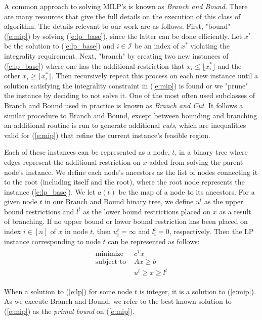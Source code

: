 \documentclass[10pt]{article}
\begin{document}
	A common approach to solving MILP's is known as \textit{Branch and Bound}. There are many resources that give the full details on the execution of this class of algorithm. The details relevant to our work are as follows. First, "bound" (\ref{e:mip}) by solving (\ref{e:lp_base}), since the latter can be done efficiently. Let $ x^* $ be the solution to (\ref{e:lp_base}) and $ i \in \mathcal{I} $ be an index of $ x^* $ violating the integrality requirement. Next, "branch" by creating two new instances of (\ref{e:lp_base}) where one has the additional restriction that $ x_i \leq \lfloor x_i^* \rfloor $ and the other $ x_i \geq \lceil x_i^* \rceil $. Then recursively repeat this process on each new instance until a solution satisfying the integrality constraint in (\ref{e:mip}) is found or we "prune" the instance by deciding to not solve it. One of the most often used subclasses of Branch and Bound used in practice is known as \textit{Branch and Cut}. It follows a similar procedure to Branch and Bound, except between bounding and branching an additional routine is run to generate additional \textit{cuts}, which are inequalities valid for (\ref{e:mip}) that refine the current instance's feasible region.
	
	Each of these instances can be represented as a node, $ t $, in a binary tree where edges represent the additional restriction on $ x $ added from solving the parent node's instance. We define each node's ancestors as the list of nodes connecting it to the root (including itself and the root), where the root node represents the instance (\ref{e:lp_base}). We let $ a(t) $ be the map of a node to its ancestors. For a given node $ t $ in our Branch and Bound binary tree, we define $ u^t $ as the upper bound restrictions and $ l^t $ as the lower bound restrictions placed on $ x $ as a result of branching. If no upper bound or lower bound restriction has been placed on index $ i \in [n] $ of $ x $ in node $ t $, then $ u_i^t = \infty $ and $ l_i^t = 0 $, respectively. Then the LP instance corresponding to node $ t $ can be represented as follows:
	\begin{align}
		\begin{split}
			\text{minimize } & c^T x \\
			\text{subject to } & Ax \geq b \\
			& u^t \geq x \geq l^t
		\end{split} \label{e:lp}
	\end{align}
	
	When a solution to (\ref{e:lp}) for some node $ t $ is integer, it is a solution to (\ref{e:mip}). As we execute Branch and Bound, we refer to the best known solution to (\ref{e:mip}) as the \textit{primal bound} on (\ref{e:mip}).
	
\end{document}
